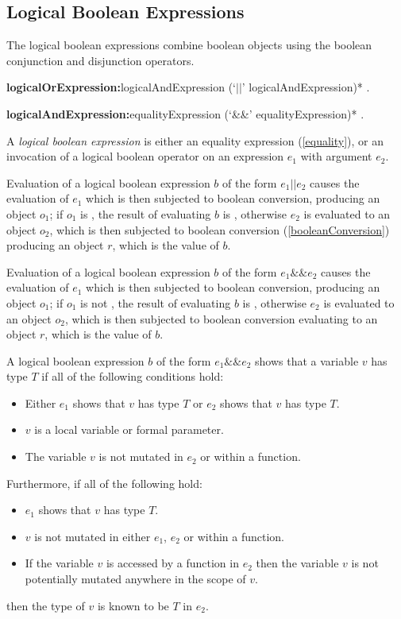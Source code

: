 \documentclass{article}
\begin{document}
\subsection{Logical Boolean Expressions}

\LMHash{}
The logical boolean expressions combine boolean objects using the boolean conjunction and disjunction operators.

\begin{grammar}
{\bf logicalOrExpression:}logicalAndExpression (`$||$' logicalAndExpression)*
  .

{\bf logicalAndExpression:}equalityExpression (`\&\&' equalityExpression)*
  .
\end{grammar}

\LMHash{}
A {\em logical boolean expression} is either an equality expression (\ref{equality}), or an invocation of a logical boolean operator on an expression $e_1$ with argument $e_2$.

\LMHash{}
Evaluation of a logical boolean expression $b$ of the form $e_1 || e_2$ causes the evaluation of $e_1$ which is then subjected to boolean conversion, producing an object $o_1$; if $o_1$ is \TRUE, the result of evaluating $b$ is \TRUE, otherwise $e_2$ is evaluated to an object $o_2$, which is then subjected to boolean conversion (\ref{booleanConversion}) producing an object $r$, which is the value of $b$.

\LMHash{}
Evaluation of a logical boolean expression $b$ of the form $e_1 \&\& e_2$ causes the evaluation of $e_1$ which is then subjected to boolean conversion, producing an object $o_1$; if $o_1$ is not \TRUE, the result of evaluating $b$ is \FALSE, otherwise $e_2$ is evaluated to an object $o_2$, which is then subjected to boolean conversion evaluating to an object $r$, which is the value of $b$.

\LMHash{}
A logical boolean expression $b$ of the form $e_1 \&\& e_2$ shows that a variable $v$ has type
$T$ if all of the following conditions hold:
\begin{itemize}
\item Either $e_1$ shows that $v$ has type $T$ or $e_2$ shows that $v$ has type $T$.
\item $v$ is a local variable or formal parameter.
\item The variable $v$ is not mutated in $e_2$ or within a function.
\end{itemize}

\LMHash{}
Furthermore, if all of the following hold:
\begin{itemize}
\item $e_1$ shows that $v$ has type $T$.
\item $v$ is not mutated in either $e_1$, $e_2$ or within a function.
\item If the variable $v$ is accessed by a function in $e_2$ then the variable $v$ is not potentially mutated anywhere in the scope of $v$.
\end{itemize}
then the type of $v$ is known to be $T$ in $e_2$.
\end{document}
